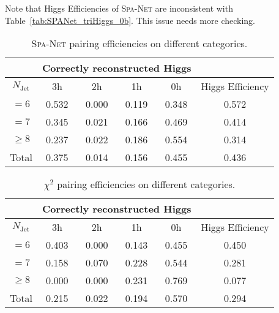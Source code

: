 \documentclass[12pt]{article}
\begin{document}
	Note that Higgs Efficiencies of \textsc{Spa-Net} are inconsistent with Table~\ref{tab:SPANet_triHiggs_0b}. This issue needs more checking.
	\begin{table}[htpb]
		\centering
		\caption{\textsc{Spa-Net} pairing efficiencies on different categories.}
		\label{tab:SPANet_triHiggs_0b_1h2h3h}
		\begin{tabular}{c|cccc|c}
			\multicolumn{1}{l|}{} & \multicolumn{4}{c|}{Correctly reconstructed Higgs} & \multicolumn{1}{l}{} \\ \hline
			$N_\text{Jet}$        & 3h          & 2h         & 1h         & 0h         & Higgs Efficiency     \\ \hline
			$=6$                  & 0.532       & 0.000      & 0.119      & 0.348      & 0.572                \\
			$=7$                  & 0.345       & 0.021      & 0.166      & 0.469      & 0.414                \\
			$\ge 8$               & 0.237       & 0.022      & 0.186      & 0.554      & 0.314                \\ \hline
			Total                 & 0.375       & 0.014      & 0.156      & 0.455      & 0.436               
		\end{tabular}
	\end{table}
	\begin{table}[htpb]
		\centering
		\caption{$\chi^2$ pairing efficiencies on different categories.}
		\label{tab:chi2_pairing_triHiggs_0b_1h2h3h}
		\begin{tabular}{c|cccc|c}
			\multicolumn{1}{l|}{} & \multicolumn{4}{c|}{Correctly reconstructed Higgs} & \multicolumn{1}{l}{} \\ \hline
			$N_\text{Jet}$        & 3h          & 2h         & 1h         & 0h         & Higgs Efficiency     \\ \hline
			$=6$                  & 0.403       & 0.000      & 0.143      & 0.455      & 0.450                \\
			$=7$                  & 0.158       & 0.070      & 0.228      & 0.544      & 0.281                \\
			$\ge 8$               & 0.000       & 0.000      & 0.231      & 0.769      & 0.077                \\ \hline
			Total                 & 0.215       & 0.022      & 0.194      & 0.570      & 0.294               
		\end{tabular}
	\end{table}


		
\end{document}

